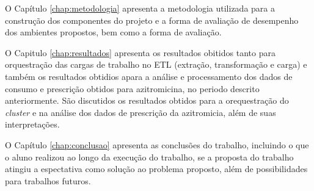 O Capítulo \ref{chap:metodologia} apresenta a  metodologia utilizada para a construção dos componentes do projeto e a forma de avaliação de desempenho dos ambientes propostos, bem como a forma de avaliação. 

O Capitulo \ref{chap:resultados} apresenta os resultados obitidos tanto para orquestração das cargas de trabalho no ETL (extração, transformação e carga) e também os resultados obtidios apara a análise e processamento dos dados de consumo e prescrição obtidos para azitromicina, no periodo descrito anteriormente.
São discutidos os resultados obtidos para a orequestração do \emph{cluster} e na análise dos dados de prescrição da azitromicia, além de suas interpretações. 

O Capítulo \ref{chap:conclusao} apresenta as conclusões do trabalho, incluindo o que o aluno realizou ao longo da execução do trabalho, se a proposta do trabalho atingiu a espectativa como solução ao problema  proposto, além de possibilidades para trabalhos futuros. 